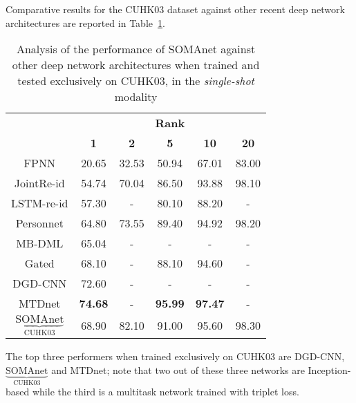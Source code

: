 \documentclass[10pt,journal,letterpaper,compsoc]{IEEEtran}
\newcommand{\ts}[2]{$\underbrace{\text{#1}}_\text{#2}$}
\begin{document}
Comparative results for the CUHK03 dataset against other recent deep network architectures are reported in Table~\ref{Table:CUHK03singleshot_training}.



\begin{table}[htbp]
\scriptsize
	\centering
\begin{minipage}[b]{0.9\columnwidth}
	\caption{Analysis of the performance of SOMAnet against other deep network architectures when trained and tested exclusively on CUHK03, in the \emph{single-shot} modality} \label{Table:CUHK03singleshot_training}
	\end{minipage}

	\begin{tabular}{cccccc}
		\toprule
		\multirow{ 2}{*}{\textbf{}} & \multicolumn{5}{c}{\textbf{Rank}} \\
		\cmidrule(r){2-6}
		 & \textbf{1} & \textbf{2}& \textbf{5} & \textbf{10} & \textbf{20} \\
		\midrule
    FPNN \cite{li2014deepreid}    & 20.65  & 32.53 & 50.94 & 67.01 & 83.00 \\
    JointRe-id \cite{Ahmed15}     & 54.74  & 70.04 & 86.50 & 93.88 & 98.10 \\
    LSTM-re-id \cite{LSTM_REID}   & 57.30  & -     & 80.10 & 88.20 & -     \\
    Personnet \cite{personnet}    & 64.80  & 73.55 & 89.40 & 94.92 & 98.20 \\
    MB-DML \cite{mbdml}           & 65.04  & -     & -     & -     & -     \\
    Gated \cite{GATED}            & 68.10  & -     & 88.10 & 94.60 & -     \\
    DGD-CNN \cite{Xiao_2016_CVPR} & 72.60 & -     & -     & -     & -     \\
    MTDnet \cite{chen2017multi} & \textbf{74.68}  & - & \textbf{95.99} & \textbf{97.47} & -     \\
    \ts{SOMAnet}{CUHK03} & 68.90 & 82.10  & 91.00  & 95.60 & 98.30 \\
    \bottomrule
    \end{tabular}
\end{table}

The top three performers when trained exclusively on CUHK03 are DGD-CNN, \ts{SOMAnet}{CUHK03} and MTDnet; note that two out of these three networks are Inception-based while the third is a multitask network trained with triplet loss.
\end{document}

